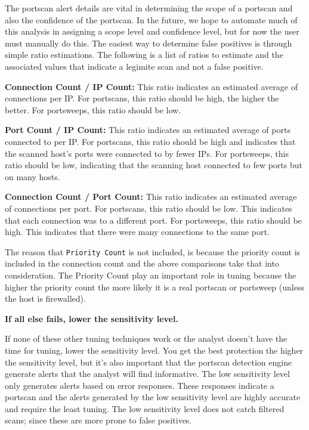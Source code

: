 \documentclass[english]{report}
\newcounter{slistnum}
\newenvironment{slist}
{ \begin{list}{ {\bf \arabic{slistnum}.} }{\usecounter{slistnum} } }
{ \end{list} }
\begin{document}
\begin{slist}
     The portscan alert details are vital in determining the scope of a portscan
     and also the confidence of the portscan.  In the future, we hope to
     automate much of this analysis in assigning a scope level and confidence
     level, but for now the user must manually do this.  The easiest way to
     determine false positives is through simple ratio estimations.  The
     following is a list of ratios to estimate and the associated values that
     indicate a legimite scan and not a false positive.
     
     \textbf{Connection Count / IP Count:}  This ratio indicates an estimated average of
     connections per IP.  For portscans, this ratio should be high, the higher
     the better.  For portsweeps, this ratio should be low.
     
     \textbf{Port Count / IP Count:}  This ratio indicates an estimated average of ports
     connected to per IP.  For portscans, this ratio should be high and
     indicates that the scanned host's ports were connected to by fewer IPs. 
     For portsweeps, this ratio should be low, indicating that the scanning host
     connected to few ports but on many hosts.
     
     \textbf{Connection Count / Port Count:}  This ratio indicates an estimated average
     of connections per port.  For portscans, this ratio should be low.  This
     indicates that each connection was to a different port.  For portsweeps,
     this ratio should be high.  This indicates that there were many connections
     to the same port.
     
     The reason that \texttt{Priority Count} is not included, is because the priority
     count is included in the connection count and the above comparisons take
     that into consideration.  The Priority Count play an important role in
     tuning because the higher the priority count the more likely it is a real
     portscan or portsweep (unless the host is firewalled).
     
\item \textbf{If all else fails, lower the sensitivity level.}
     
     If none of these other tuning techniques work or the analyst doesn't have
     the time for tuning, lower the sensitivity level.  You get the best
     protection the higher the sensitivity level, but it's also important that
     the portscan detection engine generate alerts that the analyst will find
     informative.  The low sensitivity level only generates alerts based on
     error responses.  These responses indicate a portscan and the alerts
     generated by the low sensitivity level are highly accurate and require the
     least tuning.  The low sensitivity level does not catch filtered scans;
     since these are more prone to false positives.
\end{slist}
\end{document}

